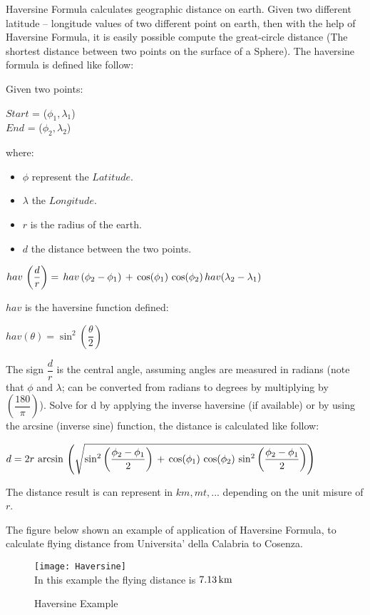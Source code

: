 \documentclass[tesi]{subfiles}
\begin{document}
\noindent Haversine Formula calculates geographic distance on earth. Given two different latitude – longitude values of two different point on earth, then with the help of Haversine Formula, it is easily possible compute the great-circle distance (The shortest distance between two points on the surface of a Sphere). 		
\noindent The haversine formula is defined like follow:

\noindent Given two points:
\begin{center}
$Start$ = ($\phi_{1} , \lambda_{1}$)\\
$End$ = ($\phi_{2} , \lambda_{2}$)
\end{center}

where:
\begin{itemize}
\item $\phi$ represent the $Latitude$.
\item $\lambda$ the $Longitude$.
\item $r$ is the radius of the earth.
\item $d$ the distance between the two points.
\end{itemize} 
\begin{center}
$ hav \thinspace \left(\dfrac{d}{r}\right) = \thinspace hav \thinspace (\phi_{2} - \phi_{1}) \thinspace + \thinspace \cos (\phi_{1}) \thinspace \cos(\phi_{2}) \thinspace hav(\lambda_{2} - \lambda_{1})$
\end{center}
$hav$ is the haversine function defined:

\begin{center}
$hav(\theta) = \sin^{2} \left(\dfrac{\theta}{2}\right)$
\end{center}

The sign $\dfrac{d}{r}$ is the central angle, assuming angles are measured in radians (note that $\phi$ and $\lambda$; can be converted from radians to degrees by multiplying by $\left(\dfrac{180}{\pi}\right)$).
Solve for d by applying the inverse haversine (if available) or by using the arcsine (inverse sine) function, the distance is calculated like follow:

\begin{center}
 $d = 2r \thinspace \arcsin \thinspace \left(\sqrt{\sin^{2} \left(\dfrac{\phi_{2} - \phi_{1}}{2}\right) \thinspace + \thinspace \cos (\phi_{1}) \thinspace \cos(\phi_{2}) \thinspace \sin^{2} \left(\dfrac{\phi_{2} - \phi_{1}}{2}\right) }\right) $
\end{center}
The distance result is can represent in $km, mt, ...$ depending on the unit misure of $r$.

The figure below shown an example of application of Haversine Formula, to calculate flying distance from Universita' della Calabria to Cosenza.

\begin{figure}[H]	
\centering
\texttt{[image: Haversine]} 
\\In this example the flying distance is $7.13 \thinspace \si{km}$
 \caption{Haversine Example}
  \label{fig:Haversine Example}
\end{figure}
\end{document}
